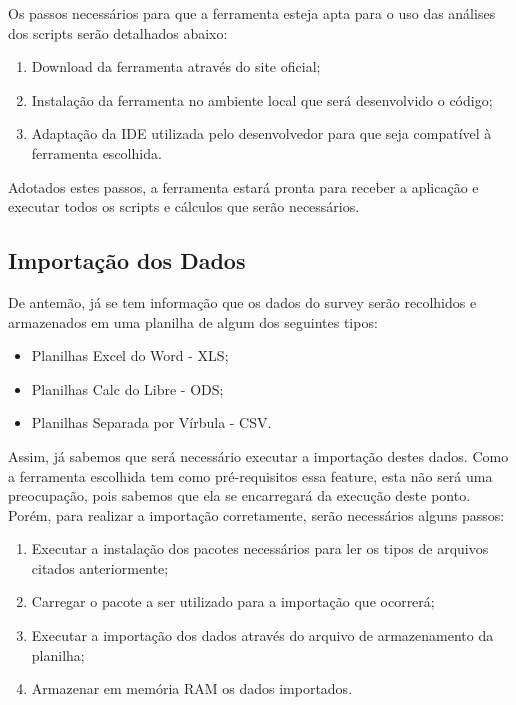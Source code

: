 Os passos necessários para que a ferramenta esteja apta para o uso das análises dos scripts serão detalhados abaixo:

\begin{enumerate}
    \item Download da ferramenta através do site oficial;
    \item Instalação da ferramenta no ambiente local que será desenvolvido o código;
    \item Adaptação da IDE utilizada pelo desenvolvedor para que seja compatível à ferramenta escolhida.
\end{enumerate}

Adotados estes passos, a ferramenta estará pronta para receber a aplicação e executar todos os scripts e cálculos que serão
necessários.

\subsection{Importação dos Dados}
\label{sub:importa_o_dos_dados}
De antemão, já se tem informação que  os dados do survey serão recolhidos e armazenados em uma planilha de algum dos seguintes tipos:

\begin{itemize}
    \item Planilhas Excel do Word - XLS;
    \item Planilhas Calc do Libre - ODS;
    \item Planilhas Separada por Vírbula - CSV.
\end{itemize}

Assim, já sabemos que será necessário executar a importação destes dados. Como a ferramenta escolhida tem como pré-requisitos
essa feature, esta não será uma preocupação, pois sabemos que ela se encarregará da execução deste ponto. Porém, para realizar
a importação corretamente, serão necessários alguns passos:

\begin{enumerate}
    \item Executar a instalação dos pacotes necessários para ler os tipos de arquivos citados anteriormente;
    \item Carregar o pacote a ser utilizado para a importação que ocorrerá;
    \item Executar a importação dos dados através do arquivo de armazenamento da planilha;
    \item Armazenar em memória RAM os dados importados.
\end{enumerate}

